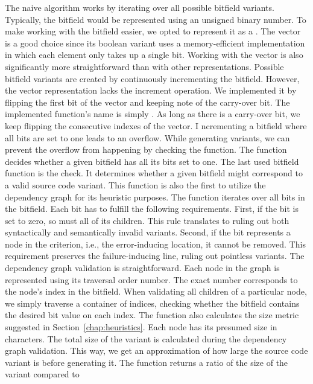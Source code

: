 The naive algorithm works by iterating over all possible bitfield variants. 
Typically, the bitfield would be represented using an unsigned binary 
number. 
To make working with the bitfield easier, we opted to represent it as 
a . 
The vector is a good choice since its boolean variant uses 
a memory-efficient implementation in which each element only takes up 
a single bit. 
Working with the vector is also significantly more straightforward than 
with other representations. 
Possible bitfield variants are created by continuously incrementing 
the bitfield. 
However, the vector representation lacks the increment operation. 
We implemented it by flipping the first bit of the vector and keeping 
note of the carry-over bit. 
The implemented function's name is simply . 
As long as there is a carry-over bit, we keep flipping the consecutive 
indexes of the vector. I
ncrementing a bitfield where all bits are set to one leads to an overflow. 
While generating variants, we can prevent the overflow from happening by 
checking the  function. 
The function decides whether a given bitfield has all its bits set to one. 
The last used bitfield function is the  check. 
It determines whether a given bitfield might correspond to a valid source 
code variant. 
This function is also the first to utilize the dependency graph for its 
heuristic purposes. 
The function iterates over all bits in the bitfield. 
Each bit has to fulfill the following requirements. 
First, if the bit is set to zero, so must all of its children. 
This rule translates to ruling out both syntactically and semantically 
invalid variants. 
Second, if the bit represents a node in the criterion, i.e., 
the error-inducing location, it cannot be removed. 
This requirement preserves the failure-inducing line, ruling out pointless 
variants. 
The dependency graph validation is straightforward. 
Each node in the graph is represented using its traversal order number.
The exact number corresponds to the node's index in the bitfield. 
When validating all children of a particular node, we simply traverse 
a container of indices, checking whether the bitfield contains the desired 
bit value on each index.
The  function also calculates the size metric suggested in 
Section~\ref{chap:heuristics}. 
Each node has its presumed size in characters. 
The total size of the variant is calculated during the dependency graph 
validation. 
This way, we get an approximation of how large the source code variant is 
before generating it. 
The function returns a ratio of the size of the variant compared to 
